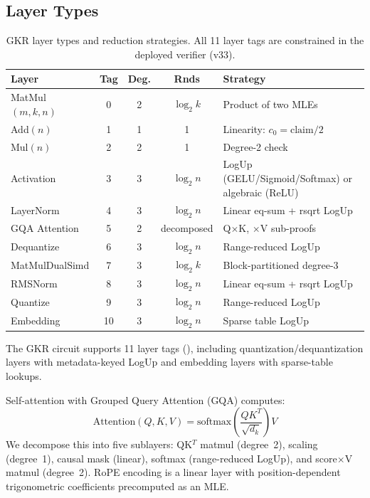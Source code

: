 \documentclass[10pt,twocolumn]{article}
\theoremstyle{definition}
\theoremstyle{remark}
\begin{document}
\subsection{Layer Types}

\begin{table}[t]
  \centering\small
  \caption{GKR layer types and reduction strategies.
           All 11 layer tags are constrained in the deployed verifier (v33).}
  \label{tab:layers}
  \begin{tabularx}{\columnwidth}{@{}lcccX@{}}
    \toprule
    \textbf{Layer} & \textbf{Tag} & \textbf{Deg.} & \textbf{Rnds} & \textbf{Strategy} \\
    \midrule
    MatMul$(m,k,n)$     & 0 & 2 & $\log_2 k$ & Product of two MLEs \\
    Add$(n)$            & 1 & 1 & 1          & Linearity: $c_0=\text{claim}/2$ \\
    Mul$(n)$            & 2 & 2 & 1          & Degree-2 check \\
    Activation          & 3 & 3 & $\log_2 n$ & LogUp (GELU/Sigmoid/Softmax) or algebraic (ReLU) \\
    LayerNorm           & 4 & 3 & $\log_2 n$ & Linear eq-sum + rsqrt LogUp \\
    GQA Attention       & 5 & 2 & decomposed & Q$\times$K, $\times$V sub-proofs \\
    Dequantize          & 6 & 3 & $\log_2 n$ & Range-reduced LogUp \\
    MatMulDualSimd      & 7 & 3 & $\log_2 k$ & Block-partitioned degree-3 \\
    RMSNorm             & 8 & 3 & $\log_2 n$ & Linear eq-sum + rsqrt LogUp \\
    Quantize            & 9 & 3 & $\log_2 n$ & Range-reduced LogUp \\
    Embedding           & 10 & 3 & $\log_2 n$ & Sparse table LogUp \\
    \bottomrule
  \end{tabularx}
\end{table}

The GKR circuit supports 11 layer tags (),
including quantization/dequantization layers with metadata-keyed
LogUp and embedding layers with sparse-table lookups.

Self-attention with Grouped Query Attention
(GQA) computes:
\[
  \text{Attention}(Q,K,V)
  = \text{softmax}\!\left(\frac{QK^T}{\sqrt{d_k}}\right)\!V
\]
We decompose this into five sublayers: QK$^T$ matmul (degree~2),
scaling (degree~1), causal mask (linear), softmax (range-reduced LogUp),
and score$\times$V matmul (degree~2).
RoPE encoding is a linear layer with position-dependent trigonometric
coefficients precomputed as an MLE.
\end{document}
